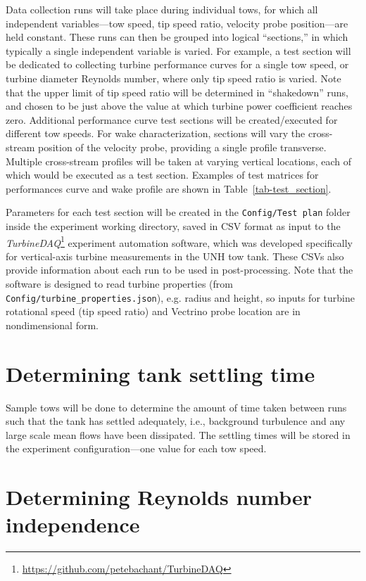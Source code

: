 \documentclass[12pt,letterpaper]{scrreprt}
\begin{document}
Data collection runs will take place during individual tows, for which all
independent variables---tow speed, tip speed ratio, velocity probe
position---are held constant. These runs can then be grouped into logical
``sections,'' in which typically a single independent variable is varied. For
example, a test section will be dedicated to collecting turbine performance
curves for a single tow speed, or turbine diameter Reynolds number, where only
tip speed ratio is varied. Note that the upper limit of tip speed ratio will be
determined in ``shakedown'' runs, and chosen to be just above the value at which
turbine power coefficient reaches zero. Additional performance curve test
sections will be created/executed for different tow speeds. For wake
characterization, sections will vary the cross-stream position of the velocity
probe, providing a single profile transverse. Multiple cross-stream profiles
will be taken at varying vertical locations, each of which would be executed as
a test section. Examples of test matrices for performances curve and wake
profile are shown in Table~\ref{tab-test_section}.

Parameters for each test section will be created in the \texttt{Config/Test
plan} folder inside the experiment working directory, saved in CSV format as
input to the
\textit{TurbineDAQ}\footnote{\url{https://github.com/petebachant/TurbineDAQ}}
experiment automation software, which was developed specifically for
vertical-axis turbine measurements in the UNH tow tank. These CSVs also provide
information about each run to be used in post-processing. Note that the software
is designed to read turbine properties (from
\texttt{Config/turbine\_properties.json}), e.g. radius and height, so inputs for
turbine rotational speed (tip speed ratio) and Vectrino probe location are in
nondimensional form.


\section{Determining tank settling time}

Sample tows will be done to determine the amount of time taken between runs such
that the tank has settled adequately, i.e., background turbulence and any large
scale mean flows have been dissipated. The settling times will be stored in the
experiment configuration---one value for each tow speed.


\section{Determining Reynolds number independence}
\end{document}
